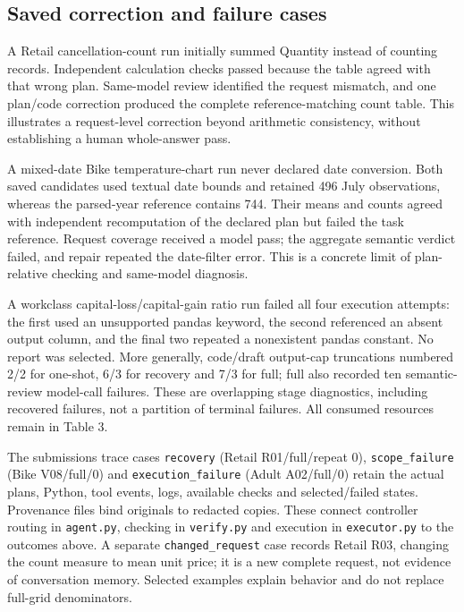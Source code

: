 \subsection{Saved correction and failure cases}\label{saved-correction-and-failure-cases}

A Retail cancellation-count run initially summed Quantity instead of counting records. Independent calculation checks passed because the table agreed with that wrong plan. Same-model review identified the request mismatch, and one plan/code correction produced the complete reference-matching count table. This illustrates a request-level correction beyond arithmetic consistency, without establishing a human whole-answer pass.

A mixed-date Bike temperature-chart run never declared date conversion. Both saved candidates used textual date bounds and retained 496 July observations, whereas the parsed-year reference contains 744. Their means and counts agreed with independent recomputation of the declared plan but failed the task reference. Request coverage received a model pass; the aggregate semantic verdict failed, and repair repeated the date-filter error. This is a concrete limit of plan-relative checking and same-model diagnosis.

A workclass capital-loss/capital-gain ratio run failed all four execution attempts: the first used an unsupported pandas keyword, the second referenced an absent output column, and the final two repeated a nonexistent pandas constant. No report was selected. More generally, code/draft output-cap truncations numbered 2/2 for one-shot, 6/3 for recovery and 7/3 for full; full also recorded ten semantic-review model-call failures. These are overlapping stage diagnostics, including recovered failures, not a partition of terminal failures. All consumed resources remain in Table 3.

The submission\textquotesingle s trace cases \texttt{recovery} (Retail R01/full/repeat 0), \texttt{scope\_failure} (Bike V08/full/0) and \texttt{execution\_failure} (Adult A02/full/0) retain the actual plans, Python, tool events, logs, available checks and selected/failed states. Provenance files bind originals to redacted copies. These connect controller routing in \texttt{agent.py}, checking in \texttt{verify.py} and execution in \texttt{executor.py} to the outcomes above. A separate \texttt{changed\_request} case records Retail R03, changing the count measure to mean unit price; it is a new complete request, not evidence of conversation memory. Selected examples explain behavior and do not replace full-grid denominators.

